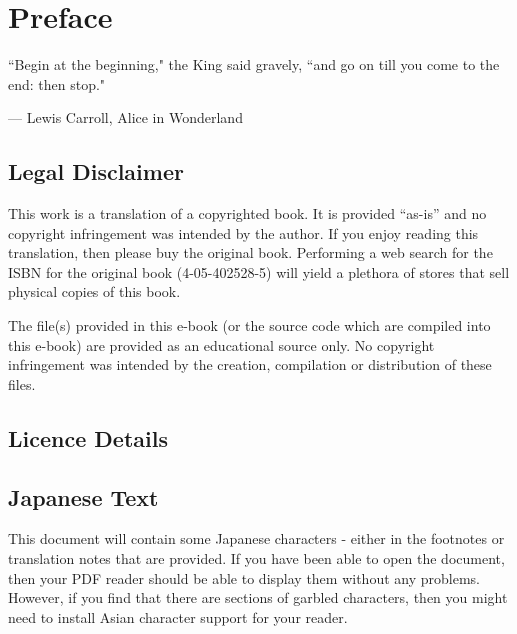 
\setcounter{footnote}{0}
\setcounter{endnote}{0}

\chapter*{Preface}

\epigraph{``Begin at the beginning," the King said gravely, ``and go on till you come to the end: then stop."}{--- \textup{Lewis Carroll}, Alice in Wonderland}

\section*{Legal Disclaimer}
This work is a translation of a copyrighted book. It is provided ``as-is'' and no copyright infringement was intended by the author. If you enjoy reading this translation, then please buy the original book. Performing a web search for the ISBN for the original book (4-05-402528-5) will yield a plethora of stores that sell physical copies of this book.

\par The file(s) provided in this e-book (or the source code which are compiled into this e-book) are provided as an educational source only. No copyright infringement was intended by the creation, compilation or distribution of these files.

\section*{Licence Details}


\section*{Japanese Text}
This document will contain some Japanese characters - either in the footnotes or translation notes that are provided. If you have been able to open the document, then your PDF reader should be able to display them without any problems. However, if you find that there are sections of garbled characters, then you might need to install Asian character support for your reader.

